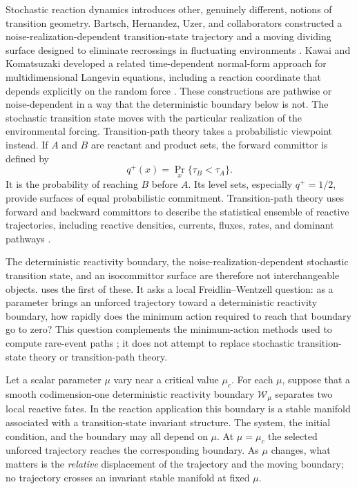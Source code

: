 \documentclass[11pt]{article}
\theoremstyle{definition}
\theoremstyle{remark}
\begin{document}
Stochastic reaction dynamics introduces other, genuinely different, notions of transition geometry.  Bartsch, Hernandez, Uzer, and collaborators constructed a noise-realization-dependent transition-state trajectory and a moving dividing surface designed to eliminate recrossings in fluctuating environments \cite{BartschHernandezUzer2005,BartschUzerHernandez2005,BartschUzerMoixHernandez2006,BartschEtAl2008,BartschRevueltaBenitoBorondo2012}.  Kawai and Komatsuzaki developed a related time-dependent normal-form approach for multidimensional Langevin equations, including a reaction coordinate that depends explicitly on the random force \cite{KawaiKomatsuzaki2009}.  These constructions are pathwise or noise-dependent in a way that the deterministic boundary below is not.  The stochastic transition state moves with the particular realization of the environmental forcing.  Transition-path theory takes a probabilistic viewpoint instead.  If $A$ and $B$ are reactant and product sets, the forward committor \cite{EVandenEijnden2006,MetznerSchuetteVandenEijnden2009} is defined by
\begin{equation}
q^+(x)=\Pr_x\{\tau_B<\tau_A\}.
\label{eq:committor}
\end{equation}
It is the probability of reaching $B$ before $A$.  Its level sets, especially $q^+=1/2$, provide surfaces of equal probabilistic commitment.  Transition-path theory uses forward and backward committors to describe the statistical ensemble of reactive trajectories, including reactive densities, currents, fluxes, rates, and dominant pathways \cite{EVandenEijnden2006,MetznerSchuetteVandenEijnden2009,EVandenEijnden2010}.

The deterministic reactivity boundary, the noise-realization-dependent stochastic transition state, and an isocommittor surface are therefore not interchangeable objects.   uses the first of these.  It asks a local Freidlin--Wentzell question: as a parameter brings an unforced trajectory toward a deterministic reactivity boundary, how rapidly does the minimum action required to reach that boundary go to zero?  This question complements the minimum-action methods used to compute rare-event paths \cite{ERenVandenEijnden2004,HeymannVandenEijnden2008}; it does not attempt to replace stochastic transition-state theory or transition-path theory.

Let a scalar parameter $\mu$ vary near a critical value $\mu_c$.  For each $\mu$, suppose that a smooth codimension-one deterministic reactivity boundary $\mathcal W_\mu$ separates two local reactive fates.  In the reaction application this boundary is a stable manifold associated with a transition-state invariant structure.  The system, the initial condition, and the boundary may all depend on $\mu$.  At $\mu=\mu_c$ the selected unforced trajectory reaches the corresponding boundary.  As $\mu$ changes, what matters is the \emph{relative} displacement of the trajectory and the moving boundary; no trajectory crosses an invariant stable manifold at fixed $\mu$.
\end{document}
